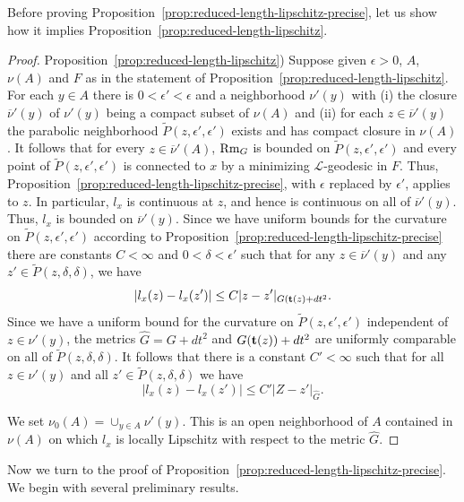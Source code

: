 Before proving Proposition~\ref{prop:reduced-length-lipschitz-precise}, let us show how it implies
Proposition~\ref{prop:reduced-length-lipschitz}.

\begin{proof}
\sketch
Proposition~\ref{prop:reduced-length-lipschitz})
Suppose given $\epsilon>0$, $A$, $\nu(A)$ and $F$ as in
the statement of Proposition~\ref{prop:reduced-length-lipschitz}. For each $y\in A$ there is
$0<\epsilon'<\epsilon$ and a neighborhood $\nu'(y)$ with (i) the closure
$\overline{\nu}'(y)$ of $\nu'(y)$ being a compact subset of $\nu(A)$ and (ii)
for each $z\in \overline{\nu}'(y)$ the parabolic neighborhood $\widetilde
P(z,\epsilon',\epsilon')$ exists and has compact closure in $\nu(A)$. It
follows that for every $z\in \overline{\nu}'(A)$, $\operatorname{Rm}_G$ is bounded on
$\widetilde P(z,\epsilon',\epsilon')$ and every point of $\widetilde
P(z,\epsilon',\epsilon')$ is connected to $x$ by a minimizing ${\mathcal
L}$-geodesic in $F$. Thus, Proposition~\ref{prop:reduced-length-lipschitz-precise}, with $\epsilon$ replaced
by $\epsilon'$, applies to $z$. In particular, $l_x$ is continuous at $z$, and
hence is continuous on all of $\overline{\nu}'(y)$. Thus, $l_x$ is bounded on
$\overline{\nu}'(y)$. Since we have uniform bounds for the curvature on
$\widetilde P(z,\epsilon',\epsilon')$ according to Proposition~\ref{prop:reduced-length-lipschitz-precise}
there are constants $C<\infty$ and $0<\delta<\epsilon'$ such that for any $z\in
\overline{\nu}'(y)$ and any $z'\in \widetilde P(z,\delta,\delta)$, we have
$$|l_x(z)-l_x(z')|\le C|z-z'|_{G({\bf t}(z)+dt^2}.$$
Since we have a uniform bound for the curvature on $\widetilde
P(z,\epsilon',\epsilon')$ independent of $z\in \nu'(y)$, the metrics $\widehat
G=G+dt^2$ and $G({\bf t}(z))+dt^2$ are uniformly comparable on all of
$\widetilde P(z,\delta,\delta)$. It follows that there is a constant
$C'<\infty$ such that for all $z\in \nu'(y)$ and all $z'\in \widetilde
P(z,\delta,\delta)$ we have
$$|l_x(z)-l_x(z')|\le C'|Z-z'|_{\widehat G}.$$

We set $\nu_0(A)=\cup_{y\in A}\nu'(y)$. This is an open neighborhood of $A$
contained in $\nu(A)$ on which $l_x$ is locally Lipschitz with respect to the
metric $\widehat G$.
\end{proof}



Now we turn to the proof of Proposition~\ref{prop:reduced-length-lipschitz-precise}. We begin with
several preliminary results.



